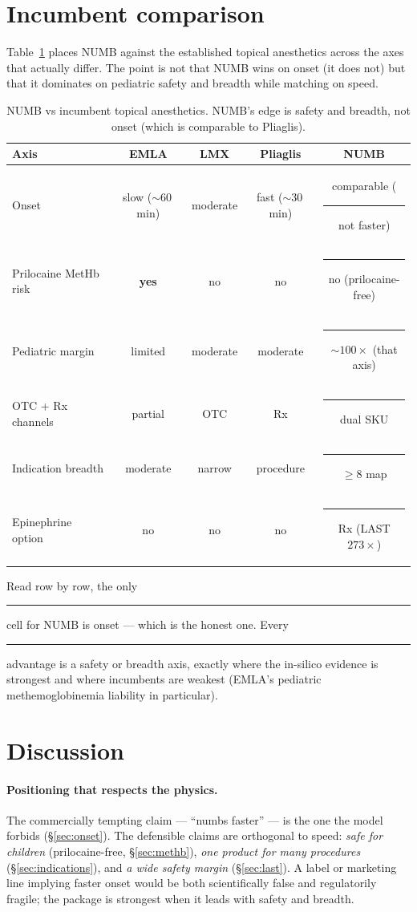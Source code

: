 \documentclass[11pt,a4paper]{article}
\newcommand{\tierdisc}[1]{\textcolor{#1}{\rule[0.05ex]{1.0ex}{1.0ex}}}
\newcommand{\tierGreen}{\tierdisc{green!60!black}}
\newcommand{\tierRed}{\tierdisc{red!80!black}}
\begin{document}
\section{Incumbent comparison}
\label{sec:incumbents}
Table~\ref{tab:incumbents} places NUMB against the established topical
anesthetics across the axes that actually differ. The point is not that NUMB
wins on onset (it does not) but that it dominates on pediatric safety and
breadth while matching on speed.

\begin{table}[h]
\centering
\caption{NUMB vs incumbent topical anesthetics. NUMB's edge is safety and
breadth, not onset (which is comparable to Pliaglis).}
\label{tab:incumbents}
\small
\begin{tabular}{@{}lcccc@{}}
\toprule
Axis & EMLA & LMX & Pliaglis & NUMB \\
\midrule
Onset & slow ($\sim$60\,min) & moderate & fast ($\sim$30\,min) & comparable (\tierRed{} not faster) \\
Prilocaine MetHb risk & \textbf{yes} & no & no & \tierGreen{} no (prilocaine-free) \\
Pediatric margin & limited & moderate & moderate & \tierGreen{} $\sim100\times$ (that axis) \\
OTC + Rx channels & partial & OTC & Rx & \tierGreen{} dual SKU \\
Indication breadth & moderate & narrow & procedure & \tierGreen{} $\ge8$ map \\
Epinephrine option & no & no & no & \tierGreen{} Rx (LAST $273\times$) \\
\bottomrule
\end{tabular}
\end{table}

Read row by row, the only \tierRed{} cell for NUMB is onset --- which is the
honest one. Every \tierGreen{} advantage is a safety or breadth axis, exactly
where the in-silico evidence is strongest and where incumbents are weakest
(EMLA's pediatric methemoglobinemia liability in particular).

\section{Discussion}
\label{sec:discussion}
\paragraph{Positioning that respects the physics.}
The commercially tempting claim --- ``numbs faster'' --- is the one the model
forbids (\S\ref{sec:onset}). The defensible claims are orthogonal to speed:
\emph{safe for children} (prilocaine-free, \S\ref{sec:methb}), \emph{one product
for many procedures} (\S\ref{sec:indications}), and \emph{a wide safety margin}
(\S\ref{sec:last}). A label or marketing line implying faster onset would be
both scientifically false and regulatorily fragile; the package is strongest
when it leads with safety and breadth.
\end{document}
